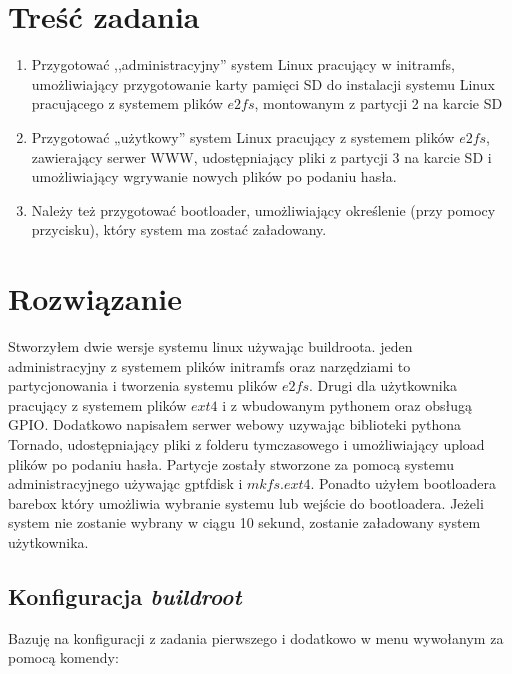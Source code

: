 
\usepackage{listings}

\maketitle
\tableofcontents
\newpage

\section{Treść zadania}
\begin{enumerate}
\item Przygotować ,,administracyjny'' system Linux pracujący w
initramfs, umożliwiający przygotowanie karty pamięci SD do
instalacji systemu Linux pracującego z systemem plików
$e2fs$, montowanym z partycji 2 na karcie SD

\item Przygotować „użytkowy” system Linux pracujący z
systemem plików $e2fs$, zawierający serwer WWW,
udostępniający pliki z partycji 3 na karcie SD i umożliwiający
wgrywanie nowych plików po podaniu hasła.

\item Należy też przygotować bootloader, umożliwiający
określenie (przy pomocy przycisku), który system ma zostać
załadowany.
\end{enumerate}

\section{Rozwiązanie}
Stworzyłem dwie wersje systemu linux używając buildroota. jeden administracyjny 
z systemem plików initramfs oraz narzędziami to partycjonowania i tworzenia systemu plików $e2fs$. 
Drugi dla użytkownika pracujący z systemem plików $ext4$ i z wbudowanym pythonem oraz obsługą GPIO.
Dodatkowo napisałem serwer webowy uzywając biblioteki pythona Tornado,
udostępniający pliki z folderu tymczasowego i umożliwiający upload 
plików po podaniu hasła. Partycje zostały stworzone za pomocą systemu administracyjnego 
używając gptfdisk i $mkfs.ext4$. Ponadto użyłem bootloadera
barebox który umożliwia wybranie systemu lub wejście do bootloadera.
Jeżeli system nie zostanie wybrany w ciągu 10 sekund, zostanie załadowany system użytkownika.

\subsection{Konfiguracja \emph{buildroot}}
Bazuję na konfiguracji z zadania pierwszego i dodatkowo w menu wywołanym za pomocą komendy:


